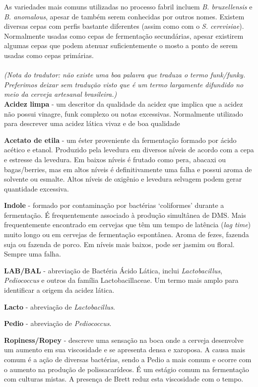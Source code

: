 As variedades mais comuns utilizadas no processo fabril incluem \textit{B. bruxellensis} e \textit{B. anomalous}, apesar de também serem conhecidas por outros nomes. Existem diversas cepas com perfis bastante diferentes (assim como com o \textit{S. cerevisiae}).  Normalmente usadas como cepas de fermentação secundárias, apesar existirem algumas cepas que podem atenuar suficientemente o mosto a ponto de serem usadas como cepas primárias.\\\\
\textit{(Nota do tradutor: não existe uma boa palavra que traduza o termo funk/funky. Preferimos deixar sem tradução visto que é um termo largamente difundido no meio da cerveja artesanal brasileira.)}\\
\textbf{Acidez limpa} - um descritor da qualidade da acidez que implica que a acidez não possui vinagre, funk complexo ou notas excessivas. Normalmente utilizado para descrever uma acidez lática vivaz e de boa qualidade

\textbf{Acetato de etila} - um éster proveniente da fermentação formado por ácido acético e etanol. Produzido pela levedura em diversos níveis de acordo com a cepa e estresse da levedura. Em baixos níveis é frutado como pera, abacaxi ou bagas/berries, mas em altos níveis é definitivamente uma falha e possui aroma de solvente ou esmalte. Altos níveis de oxigênio e levedura selvagem podem gerar quantidade excessiva.

\textbf{Indole} - formado por contaminação por bactérias ‘coliformes’ durante a fermentação. É frequentemente associado à produção simultânea de DMS. Mais frequentemente encontrado em cervejas que têm um tempo de latência (\textit{lag time}) muito longo ou em cervejas de fermentação espontânea. Aroma de fezes, fazenda suja ou fazenda de porco. Em níveis mais baixos, pode ser jasmim ou floral. Sempre uma falha.

\textbf{LAB/BAL} - abreviação de Bactéria Ácido Lática, inclui \textit{Lactobacillus}, \textit{Pediococcus} e outros da família Lactobacillaceae. Um termo mais amplo para identificar a origem da acidez lática.

\textbf{Lacto} - abreviação de \textit{Lactobacillus}.

\textbf{Pedio} - abreviação de \textit{Pediococcus}.

\textbf{Ropiness/Ropey} - descreve uma sensação na boca onde a cerveja desenvolve um aumento em sua viscosidade e se apresenta densa e xaroposa. A causa mais comum é a ação de diversas bactérias, sendo a Pedio a mais comum e ocorre com o aumento na produção de polissacarídeos. É um estágio comum na fermentação com culturas mistas. A presença de Brett reduz esta viscosidade com o tempo.

